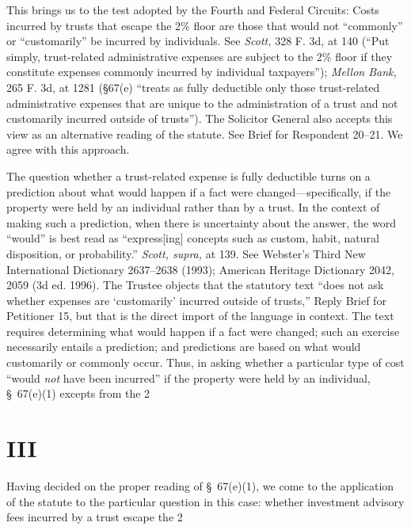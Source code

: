   This brings us to the test adopted by the Fourth and Federal Circuits: Costs incurred by trusts that escape the 2\% floor are those that would not ``commonly'' or ``customarily'' be incurred by individuals. See \emph{Scott,} 328 F. 3d, at 140 (``Put simply, trust-related administrative expenses are subject to the 2\% floor if they constitute expenses commonly incurred by individual taxpayers''); \emph{Mellon Bank,} 265 F. 3d, at 1281 (\S67(e) ``treats as fully deductible only those trust-related administrative expenses that are unique to the administration of a trust and not customarily incurred outside of trusts''). The Solicitor General also accepts this view as an alternative reading of the statute. See Brief for Respondent 20--21. We agree with this approach.\newpage 

  The question whether a trust-related expense is fully deductible turns on a prediction about what would happen if a fact were changed---specifically, if the property were held by an individual rather than by a trust. In the context of making such a prediction, when there is uncertainty about the answer, the word ``would'' is best read as ``express[ing] concepts such as custom, habit, natural disposition, or probability.'' \emph{Scott, supra,} at 139. See Webster's Third New International Dictionary 2637--2638 (1993); American Heritage Dictionary 2042, 2059 (3d ed. 1996). The Trustee objects that the statutory text ``does not ask whether expenses are ‘customarily' incurred outside of trusts,'' Reply Brief for Petitioner 15, but that is the direct import of the language in context. The text requires determining what would happen if a fact were changed; such an exercise necessarily entails a prediction; and predictions are based on what would customarily or commonly occur. Thus, in asking whether a particular type of cost ``would \emph{not} have been incurred'' if the property were held by an individual, \S~67(e)(1) excepts from the 2%

\section{III}

  Having decided on the proper reading of \S~67(e)(1), we come to the application of the statute to the particular question in this case: whether investment advisory fees incurred by a trust escape the 2%

